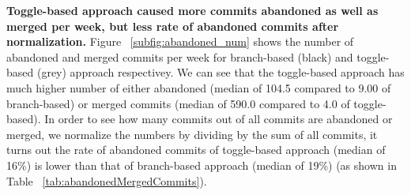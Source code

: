 \textbf{Toggle-based approach caused more commits abandoned as well as merged per week, but less rate of abandoned commits after normalization.}
Figure ~\ref{subfig:abandoned_num} shows the number of abandoned and merged commits per week for branch-based (black) and toggle-based (grey) approach respectivey. We can see that the toggle-based approach has much higher number of either abandoned (median of 104.5 compared to 9.00 of branch-based) or merged commits (median of 590.0 compared to 4.0 of toggle-based). In order to see how many commits out of all commits are abandoned or merged, we normalize the numbers by dividing by the sum of all commits, it turns out the rate of abandoned commits of toggle-based approach (median of 16\%) is lower than that of branch-based approach (median of 19\%) (as shown in Table ~\ref{tab:abandonedMergedCommits}).



